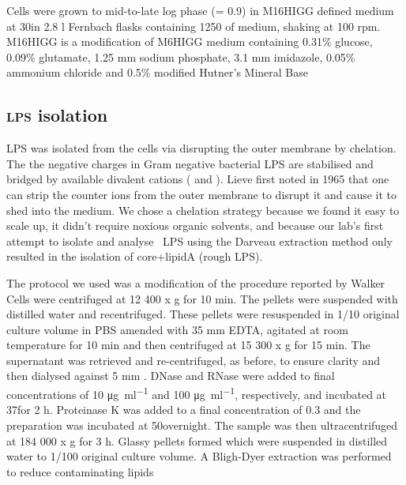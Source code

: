 		Cells were grown to mid-to-late log phase (\od = 0.9) in M16HIGG defined medium at 30\cel in 2.8 \si{\litre} Fernbach flasks containing 1250 \millilitre of medium, shaking at 100 rpm. M16HIGG is a modification of M6HIGG medium containing 0.31\% glucose, 0.09\% glutamate, 1.25 \si{\milli\meter} sodium phosphate, 3.1 \si{\milli\meter} imidazole, 0.05\% ammonium chloride and 0.5\% modified Hutner's Mineral Base 

	\subsection{\textsc{lps} isolation} %
	\label{sub:LPS_isolation}

		\ac{LPS} was isolated from the cells via disrupting the outer membrane by chelation.
		 The the negative charges in Gram negative bacterial \ac{LPS} are stabilised and bridged by available divalent cations (\ie{}  and ). Lieve
		 first noted in 1965
		 that one can strip the counter ions from the outer membrane to disrupt it and cause it to shed into the medium. We chose a chelation strategy because we found it easy to scale up, it didn't require noxious organic solvents, and because our lab's first attempt to isolate and analyse \caulobacter\ \ac{LPS} using the Darveau extraction method 
		 only resulted in the isolation of core+lipidA (rough \ac{LPS}).

		 The protocol we used was a modification of the procedure reported by Walker \etal\! Cells were centrifuged at 12 400 x g for 10 min. The pellets were suspended with distilled water and recentrifuged. These pellets were resuspended in 1/10 original culture volume in \ac{PBS} amended with 35 \si{\milli\meter} \ac{EDTA}, agitated at room temperature for 10 min and then centrifuged at 15 300 x g for 15 min. The supernatant was retrieved and re-centrifuged, as before, to ensure clarity and then dialysed against 5 \si{\milli\meter} . DNase and RNase were added to final concentrations of 10 \si{\micro\gram\per\milli\litre} and 100 \si{\micro\gram\per\milli\litre}\!, respectively, and incubated at 37\cel for 2 h. Proteinase K was added to a final concentration of 0.3 \mgperml and the preparation was incubated at 50\cel overnight. The sample was then ultracentrifuged at 184 000 x g for 3 h. Glassy pellets formed which were suspended in distilled water to 1/100 original culture volume. A Bligh-Dyer extraction was performed to reduce contaminating lipids

